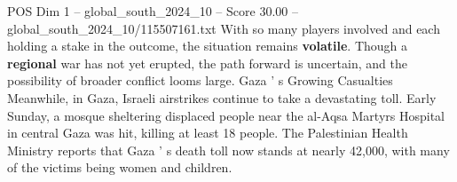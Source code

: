\begin{textsample}{POS Dim 1 – global\_south\_2024\_10 – Score 30.00 – global\_south\_2024\_10/115507161.txt}
With so many players involved and each holding a stake in the outcome, the situation remains \textbf{volatile}.
Though a \textbf{regional} war has not yet erupted, the path forward is uncertain, and the possibility of broader conflict looms large.
Gaza ' s Growing Casualties Meanwhile, in Gaza, Israeli airstrikes continue to take a devastating toll.
Early Sunday, a mosque sheltering displaced people near the al-Aqsa Martyrs Hospital in central Gaza was hit, killing at least 18 people.
The Palestinian Health Ministry reports that Gaza ' s death toll now stands at nearly 42,000, with many of the victims being women and children.

\end{textsample}

